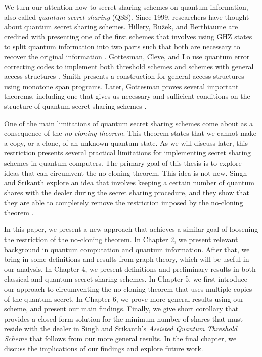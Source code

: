 We turn our attention now to secret sharing schemes on quantum information, also called \textit{quantum secret sharing} (QSS). Since 1999, researchers have thought about quantum secret sharing schemes. Hillery, Bu\u{z}ek, and Berthiaume are credited with presenting one of the first schemes that involves using GHZ states to split quantum information into two parts such that both are necessary to recover the original information \cite{hillery_quantum_1999}. Gottesman, Cleve, and Lo use quantum error correcting codes to implement both threshold schemes and schemes with general access structures \cite{cleve_how_1999}. Smith presents a construction for general access structures using monotone span programs. Later, Gottesman proves several important theorems, including one that gives us necessary and sufficient conditions on the structure of quantum secret sharing schemes \cite{gottesman_theory_2000}.

One of the main limitations of quantum secret sharing schemes come about as a consequence of the \textit{no-cloning theorem}. This theorem states that we cannot make a copy, or a clone, of an unknown quantum state. As we will discuss later, this restriction presents several practical limitations for implementing secret sharing schemes in quantum computers. The primary goal of this thesis is to explore ideas that can circumvent the no-cloning theorem. This idea is not new. Singh and Srikanth explore an idea that involves keeping a certain number of quantum shares with the dealer during the secret sharing procedure, and they show that they are able to completely remove the restriction imposed by the no-cloning theorem \cite{singh_assisted_2004}.

In this paper, we present a new approach that achieves a similar goal of loosening the restriction of the no-cloning theorem. In Chapter 2, we present relevant background in quantum computation and quantum information. After that, we bring in some definitions and results from graph theory, which will be useful in our analysis. In Chapter 4, we present definitions and preliminary results in both classical and quantum secret sharing schemes. In Chapter 5, we first introduce our approach to circumventing the no-cloning theorem that uses multiple copies of the quantum secret. In Chapter 6, we prove more general results using our scheme, and present our main findings. Finally, we give short corollary that provides a closed-form solution for the minimum number of shares that must reside with the dealer in Singh and Srikanth's \textit{Assisted Quantum Threshold Scheme} that follows from our more general results. In the final chapter, we discuss the implications of our findings and explore future work.